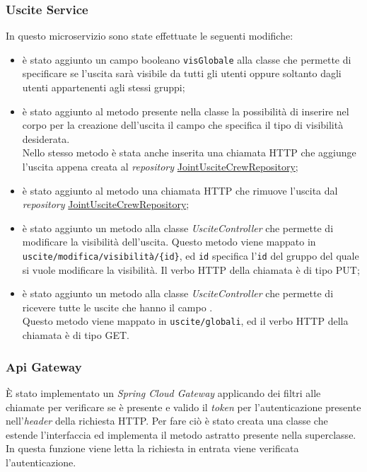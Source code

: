 \subsubsection{Uscite Service}
In questo \gls{microservizio} sono state effettuate le seguenti modifiche: 
\begin{itemize}
    \item è stato aggiunto un campo booleano \texttt{visGlobale} alla classe  che permette di specificare se l'uscita sarà visibile da tutti gli utenti oppure soltanto dagli utenti appartenenti agli stessi gruppi;
    \item è stato aggiunto al metodo  presente nella classe  la possibilità di inserire nel corpo per la creazione dell'uscita il campo che specifica il tipo di visibilità desiderata. \\
    Nello stesso metodo è stata anche inserita una chiamata HTTP che aggiunge l'uscita appena creata al \textit{repository} \hyperref[JointUsciteCrewRepository]{JointUsciteCrewRepository};
    \item è stato aggiunto al metodo  una chiamata HTTP che rimuove l'uscita dal \textit{repository} \hyperref[JointUsciteCrewRepository]{JointUsciteCrewRepository};
    \item è stato aggiunto un metodo   alla classe \textit{UsciteController} che permette di modificare la visibilità dell'uscita.
    Questo metodo viene mappato in \texttt{uscite/modifica/visibilità/\{id\}}, ed \texttt{id} specifica l'\texttt{id} del gruppo del quale si vuole modificare la visibilità. Il verbo HTTP della chiamata è di tipo PUT; 
    \item è stato aggiunto un metodo   alla classe \textit{UsciteController} che permette di ricevere tutte le uscite che hanno il campo . \\
    Questo metodo viene mappato in \texttt{uscite/globali}, ed il verbo HTTP della chiamata è di tipo GET.
\end{itemize}


\subsubsection{Api Gateway}
È stato implementato un \textit{Spring Cloud Gateway} applicando dei filtri alle chiamate per verificare se è presente e valido il \textit{token} per l'autenticazione  presente nell'\textit{header} della richiesta HTTP.
Per fare ciò è stato creata una classe  che estende l'interfaccia  ed implementa il metodo astratto  presente nella superclasse. In questa funzione viene letta la richiesta in entrata viene verificata l'autenticazione.

